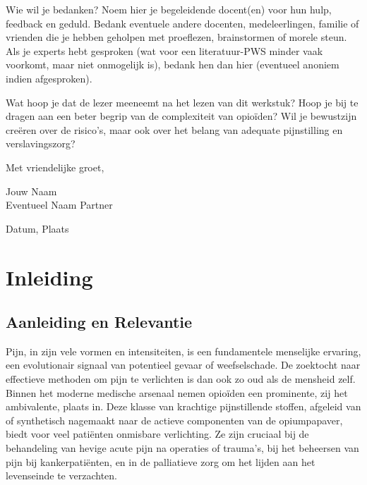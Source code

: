 \documentclass[11pt, a4paper]{report} %
\begin{document}
Wie wil je bedanken? Noem hier je begeleidende docent(en) voor hun hulp, feedback en geduld. Bedank eventuele andere docenten, medeleerlingen, familie of vrienden die je hebben geholpen met proeflezen, brainstormen of morele steun. Als je experts hebt gesproken (wat voor een literatuur-PWS minder vaak voorkomt, maar niet onmogelijk is), bedank hen dan hier (eventueel anoniem indien afgesproken).

Wat hoop je dat de lezer meeneemt na het lezen van dit werkstuk? Hoop je bij te dragen aan een beter begrip van de complexiteit van opioïden? Wil je bewustzijn creëren over de risico's, maar ook over het belang van adequate pijnstilling en verslavingszorg?

\lipsum[1] %

Met vriendelijke groet,

Jouw Naam \\
Eventueel Naam Partner

Datum, Plaats


\tableofcontents
\cleardoublepage %

\setcounter{page}{1} %

\chapter{Inleiding}
\label{chap:inleiding}

\section{Aanleiding en Relevantie}
Pijn, in zijn vele vormen en intensiteiten, is een fundamentele menselijke ervaring, een evolutionair signaal van potentieel gevaar of weefselschade. De zoektocht naar effectieve methoden om pijn te verlichten is dan ook zo oud als de mensheid zelf. Binnen het moderne medische arsenaal nemen opioïden een prominente, zij het ambivalente, plaats in. Deze klasse van krachtige pijnstillende stoffen, afgeleid van of synthetisch nagemaakt naar de actieve componenten van de opiumpapaver, biedt voor veel patiënten onmisbare verlichting. Ze zijn cruciaal bij de behandeling van hevige acute pijn na operaties of trauma's, bij het beheersen van pijn bij kankerpatiënten, en in de palliatieve zorg om het lijden aan het levenseinde te verzachten.
\end{document}
